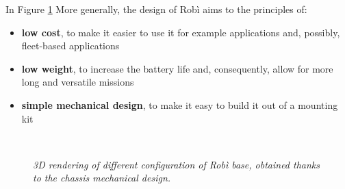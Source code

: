 In Figure \ref{fig:robiConfigurations}
 More generally, the design of Robì aims to the principles of:
 
\begin{itemize}
	\item \textbf{low cost}, to make it easier to use it for example applications and, possibly, fleet-based applications
	\item \textbf{low weight}, to increase the battery life and, consequently, allow for more long and versatile missions
	\item \textbf{simple mechanical design}, to make it easy to build it out of a mounting kit
\end{itemize}

\begin{figure}
	\centering
	\qquad
	 \\
	\caption{\textit{3D rendering of different configuration of Robì base, obtained thanks to the chassis mechanical design.}}
	\label{fig:robiConfigurations}
\end{figure}




